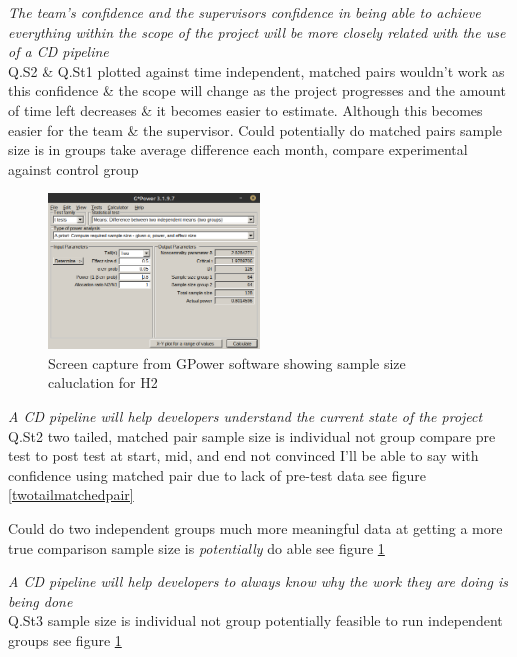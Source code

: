 \documentclass[lettersize,journal]{IEEEtran}
\begin{document}
        \textit{The team's confidence and the supervisors confidence in being able to achieve everything within the scope of the project will be more closely related with the use of a CD pipeline} \\
            Q.S2 \& Q.St1 plotted against time
            independent, matched pairs wouldn't work as this confidence \& the scope will change as the project progresses and the amount of time left decreases \& it becomes easier to estimate. Although this becomes easier for the team \& the supervisor.
            Could potentially do matched pairs
            sample size is in groups
            take average difference each month, compare experimental against control group
            \begin{figure}[h!]
                \includegraphics[width=0.5\textwidth]{Images/GPower_Independent.png}
                \caption{Screen capture from GPower software showing sample size caluclation for H2}
                \label{twotailindependent}
            \end{figure}

        \textit{A CD pipeline will help developers understand the current state of the project} \\
            Q.St2
            two tailed, matched pair
            sample size is individual not group
            compare pre test to post test at start, mid, and end
            not convinced I'll be able to say with confidence using matched pair due to lack of pre-test data
            see figure \ref{twotailmatchedpair}

            Could do two independent groups
            much more meaningful data at getting a more true comparison
            sample size is \textit{potentially} do able
            see figure \ref{twotailindependent}


        \textit{A CD pipeline will help developers to always know why the work they are doing is being done} \\
            Q.St3
            sample size is individual not group
            potentially feasible to run independent groups
            see figure \ref{twotailindependent}
\end{document}
